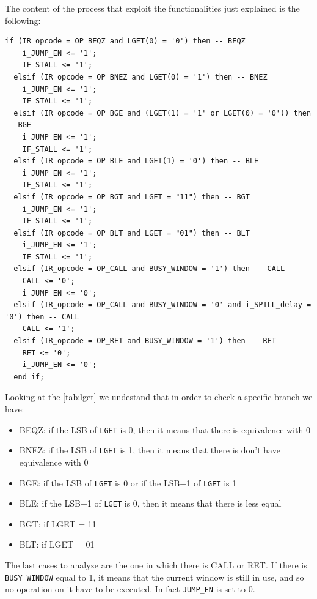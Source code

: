 The content of the process that exploit the functionalities just explained is the following:
\newline

\begin{lstlisting}[style=vhdl,caption={VHDL code for the conditional branch},label=conditional_branches_code]
  if (IR_opcode = OP_BEQZ and LGET(0) = '0') then -- BEQZ 
    i_JUMP_EN <= '1';
    IF_STALL <= '1';
  elsif (IR_opcode = OP_BNEZ and LGET(0) = '1') then -- BNEZ
    i_JUMP_EN <= '1';
    IF_STALL <= '1';
  elsif (IR_opcode = OP_BGE and (LGET(1) = '1' or LGET(0) = '0')) then -- BGE
    i_JUMP_EN <= '1';
    IF_STALL <= '1';
  elsif (IR_opcode = OP_BLE and LGET(1) = '0') then -- BLE
    i_JUMP_EN <= '1';
    IF_STALL <= '1';
  elsif (IR_opcode = OP_BGT and LGET = "11") then -- BGT
    i_JUMP_EN <= '1';
    IF_STALL <= '1';
  elsif (IR_opcode = OP_BLT and LGET = "01") then -- BLT
    i_JUMP_EN <= '1';
    IF_STALL <= '1';
  elsif (IR_opcode = OP_CALL and BUSY_WINDOW = '1') then -- CALL
    CALL <= '0';
    i_JUMP_EN <= '0';	
  elsif (IR_opcode = OP_CALL and BUSY_WINDOW = '0' and i_SPILL_delay = '0') then -- CALL
    CALL <= '1';
  elsif (IR_opcode = OP_RET and BUSY_WINDOW = '1') then -- RET
    RET <= '0';
    i_JUMP_EN <= '0';
  end if;
\end{lstlisting}

Looking at the \autoref{tab:lget} we undestand that in order to check a specific branch we have:

\begin{itemize}
  \item BEQZ: if the LSB of \texttt{LGET} is 0, then it means that there is equivalence with 0
  \item BNEZ: if the LSB of \texttt{LGET} is 1, then it means that there is don't have equivalence with 0
  \item BGE: if the LSB of \texttt{LGET} is 0 or if the LSB+1 of \texttt{LGET} is 1
  \item BLE: if the LSB+1 of \texttt{LGET} is 0, then it means that there is less equal
  \item BGT: if LGET = 11
  \item BLT: if LGET = 01
\end{itemize}

The last cases to analyze are the one in which there is CALL or RET. If there is \texttt{BUSY\_WINDOW} equal to 1, it means that the current window is still in use, and so no operation on it have to be executed. In fact \texttt{JUMP\_EN} is set to 0.

